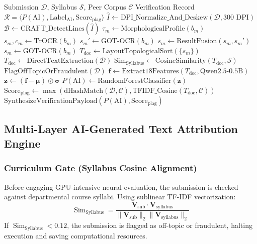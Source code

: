 \documentclass[journal]{IEEEtran}
\begin{document}
\begin{algorithm}[!t]
\caption{End-to-End Multi-Modal Plagiarism and AI Attribution}
\label{alg:pipeline}
\begin{algorithmic}[1]
\REQUIRE Submission $\mathcal{D}$, Syllabus $\mathcal{S}$, Peer Corpus $\mathcal{C}$
\ENSURE Verification Record $\mathcal{R} = \langle P(\text{AI}), \text{Label}_{\text{AI}}, \text{Score}_{\text{plag}} \rangle$
    \STATE $\hat{I} \leftarrow \text{DPI\_Normalize\_And\_Deskew}(\mathcal{D}, 300\text{ DPI})$
    \STATE $\mathcal{B} \leftarrow \text{CRAFT\_DetectLines}(\hat{I})$
        \STATE $\tau_m \leftarrow \text{MorphologicalProfile}(b_m)$
            \STATE $s_m, c_m \leftarrow \text{TrOCR}(b_m)$
                \STATE $s_m' \leftarrow \text{GOT-OCR}(b_m)$
                \STATE $s_m \leftarrow \text{ResultFusion}(s_m, s_m')$
            \ENDIF
        \ELSE
            \STATE $s_m \leftarrow \text{GOT-OCR}(b_m)$
        \ENDIF
    \ENDFOR
    \STATE $T_{\text{doc}} \leftarrow \text{LayoutTopologicalSort}(\{s_m\})$
\ELSE
    \STATE $T_{\text{doc}} \leftarrow \text{DirectTextExtraction}(\mathcal{D})$
\ENDIF
\STATE $\text{Sim}_{\text{Syllabus}} \leftarrow \text{CosineSimilarity}(T_{\text{doc}}, \mathcal{S})$
    \RETURN $\text{FlagOffTopicOrFraudulent}(\mathcal{D})$
\ENDIF
\STATE $\mathbf{f} \leftarrow \text{Extract18Features}(T_{\text{doc}}, \text{Qwen2.5-0.5B})$
\STATE $\mathbf{z} \leftarrow (\mathbf{f} - \boldsymbol{\mu}) \oslash \boldsymbol{\sigma}$
\STATE $P(\text{AI}) \leftarrow \text{RandomForestClassifier}(\mathbf{z})$
\STATE $\text{Score}_{\text{plag}} \leftarrow \max(\text{dHashMatch}(\mathcal{D}, \mathcal{C}), \text{TFIDF\_Cosine}(T_{\text{doc}}, \mathcal{C}))$
\RETURN $\text{SynthesizeVerificationPayload}(P(\text{AI}), \text{Score}_{\text{plag}})$
\end{algorithmic}
\end{algorithm}

\subsection{Multi-Layer AI-Generated Text Attribution Engine}

\subsubsection{Curriculum Gate (Syllabus Cosine Alignment)}
Before engaging GPU-intensive neural evaluation, the submission is checked against departmental course syllabi. Using sublinear TF-IDF vectorization:
\begin{equation}
    \operatorname{Sim}_{\text{Syllabus}} = \frac{\mathbf{V}_{\text{sub}} \cdot \mathbf{V}_{\text{syllabus}}}{\|\mathbf{V}_{\text{sub}}\|_2 \|\mathbf{V}_{\text{syllabus}}\|_2}
\end{equation}
If $\operatorname{Sim}_{\text{Syllabus}} < 0.12$, the submission is flagged as off-topic or fraudulent, halting execution and saving computational resources.
\end{document}
